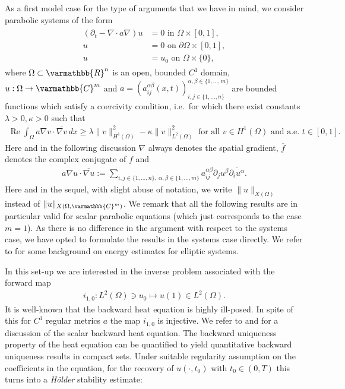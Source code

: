 \documentclass[12pt,twoside]{amsart}
\numberwithin{equation}{section}
\renewcommand{\geq}{\geqslant}
\renewcommand{\mathbb}{\varmathbb}
\newcommand {\R} {\mathbb{R}} \newcommand {\Z} {\mathbb{Z}}
\newcommand {\C} {\mathbb{C}} \newcommand {\Sn} {\mathbb{S}^n}
\newcommand {\p} {\partial}
\DeclareMathOperator {\Ree} {Re}
\begin{document}
As a first model case for the type of arguments that we have in mind, we consider parabolic systems of the form
\begin{align}
\label{eq:heat}
\begin{split}
(\p_t - \nabla \cdot a \nabla) u & = 0 \mbox{ in } \Omega \times [0,1],\\
u & = 0 \mbox{ on } \partial \Omega \times [0,1],\\
u & = u_0 \mbox{ on } \Omega \times \{0\},
\end{split}
\end{align}
where $\Omega \subset \R^n$ is an open, bounded $C^1$ domain, $u:\Omega \rightarrow \C^m$ and $a = (a_{ij}^{\alpha \beta}(x,t))^{\alpha, \beta \in \{1,\dots,m\}}_{i,j\in\{1,\dots,n\}} $ are bounded functions which satisfy a coercivity condition, i.e.\ for which there exist constants $\lambda>0,\kappa>0$ such that 
\begin{align}
\label{eq:ell2}
\Ree \int_{\Omega} a \nabla v \cdot \overline{\nabla v} \,dx \geq \lambda\|v\|_{H^1(\Omega)}^2 - \kappa \|v\|_{L^2(\Omega)}^2
\mbox{ for all } v \in H^1(\Omega) \mbox{ and a.e.\ } t \in [0,1].
\end{align}
Here and in the following discussion $\nabla$ always denotes the spatial gradient, $\overline{f}$ denotes the complex conjugate of $f$ and
\begin{align}
\label{eq:ell1}
a \nabla u \cdot \overline{\nabla u}
:= \sum\limits_{i,j\in \{1,\dots,n\}, \ \alpha,\beta \in \{1,\dots,m\}} a^{\alpha \beta}_{ij}\p_j u^{\beta} \overline{\p_i u^{\alpha}}.
\end{align}
Here and in the sequel, with slight abuse of notation, we write $\|u \|_{X(\Omega)}$ instead of $\|u\|_{X(\Omega, \C^m)}$. We remark that all the following results are in particular valid for scalar parabolic equations (which just corresponds to the case $m=1$). As there is no difference in the argument with respect to the systems case, we have opted to formulate the results in the systems case directly. We refer to \cite{McLean} for some background on energy estimates for elliptic systems.

In this set-up we are interested in the inverse problem associated with the forward map 
\begin{align}
\label{eq:J(1,0)}
i_{1,0}: L^2(\Omega)\ni u_0 \mapsto u(1) \in L^2(\Omega).
\end{align}
It is well-known that the backward heat equation is highly ill-posed. In spite of this for $C^1$ regular metrics $a$  the map $i_{1,0}$ is injective. We refer to \cite[Chapter 3.1]{Isakov} and \cite[Section 9.1]{Yamamoto} for a discussion of the scalar backward heat equation. The backward uniqueness property of the heat equation can be quantified to yield quantitative backward uniqueness results in compact sets. Under suitable regularity assumption on the coefficients in the equation, for the recovery of $u(\cdot, t_0)$ with $t_0 \in (0,T)$ this turns into a \emph{H{\"o}lder} stability estimate: 
\end{document}

